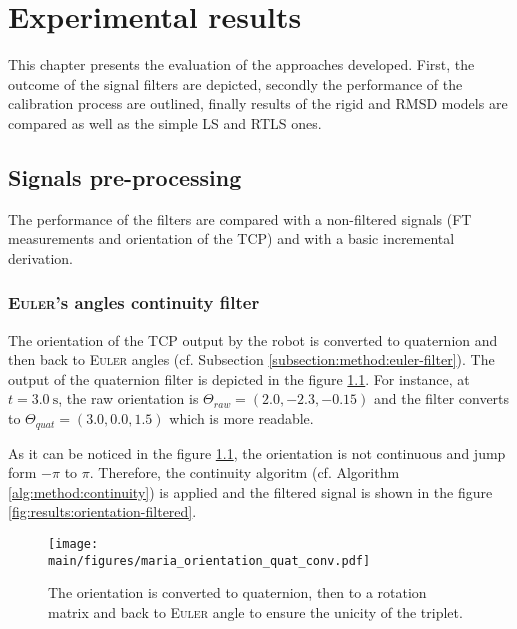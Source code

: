 \documentclass[/home/francois/latex/report/main.tex]{subfiles}
\begin{document}
\chapter{Experimental results}
\label{chapter:results}

This chapter presents the evaluation of the approaches developed. First, the outcome of the signal filters are depicted, secondly the performance of the calibration process are outlined, finally results of the rigid and \ac{RMSD} models are compared as well as the simple \ac{LS} and \ac{RTLS} ones.

\section{Signals pre-processing}
\label{section:results:pre-processing}

The performance of the filters are compared with a non-filtered signals (\ac{FT} measurements and orientation of the \ac{TCP}) and with a basic incremental derivation.

\subsection{\textsc{Euler}'s angles continuity filter}

The orientation of the \ac{TCP} output by the robot is converted to quaternion and then back to \textsc{Euler} angles (cf. Subsection \ref{subsection:method:euler-filter}). The output of the quaternion filter is depicted in the figure \ref{fig:results:quat-conv}. For instance, at $t = 3.0 \ \si{\second}$, the raw orientation is $\Theta_{raw} = (2.0, -2.3, -0.15)$ and the filter converts to  $\Theta_{quat} = (3.0, 0.0, 1.5)$ which is more readable.

As it can be noticed in the figure \ref{fig:results:quat-conv}, the orientation is not continuous and jump form $-\pi$ to $\pi$. Therefore, the continuity algoritm (cf. Algorithm \ref{alg:method:continuity}) is applied and the filtered signal is shown in the figure \ref{fig:results:orientation-filtered}.

\begin{figure}[h]
  \centering
  \texttt{[image: \\main/figures/maria\_orientation\_quat\_conv.pdf]}
  \caption{The orientation is converted to quaternion, then to a rotation matrix and back to \textsc{Euler} angle to ensure the unicity of the triplet.}
  \label{fig:results:quat-conv}
\end{figure}
\end{document}
